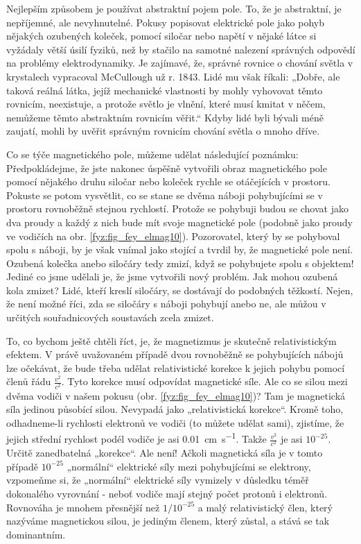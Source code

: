     Nejlepším způsobem je používat abstraktní pojem pole. To, že je abstraktní, je nepříjemné, ale   
    nevyhnutelné. Pokusy popisovat elektrické pole jako pohyb nějakých ozubených koleček, pomocí 
    siločar nebo napětí v nějaké látce si vyžádaly větší úsilí fyziků, než by stačilo na samotné 
    nalezení správných odpovědí na problémy elektrodynamiky. Je zajímavé, že, správné rovnice o 
    chování světla v krystalech vypracoval McCullough už r. 1843. Lidé mu však říkali: „Dobře, ale 
    taková reálná látka, jejíž mechanické vlastnosti by mohly vyhovovat těmto rovnicím, neexistuje, 
    a protože světlo je vlnění, které musí kmitat v něčem, nemůžeme těmto abstraktním rovnicím 
    věřit.“ Kdyby lidé byli bývali méně zaujatí, mohli by uvěřit správným rovnicím chování světla o 
    mnoho dříve.
    
    Co se týče magnetického pole, můžeme udělat následující poznámku: Předpokládejme, že jste 
    nakonec úspěšně vytvořili obraz magnetického pole pomocí nějakého druhu siločar nebo koleček 
    rychle se otáčejících v prostoru. Pokuste se potom vysvětlit, co se stane se dvěma náboji 
    pohybujícími se v prostoru rovnoběžně stejnou rychlostí. Protože se pohybuji budou se chovat 
    jako dva proudy a každý z nich bude mít svoje magnetické pole (podobně jako proudy ve vodičích 
    na obr. \ref{fyz:fig_fey_elmag10}). Pozorovatel, který by se pohyboval spolu s náboji, by je 
    však vnímal jako stojící a tvrdil by, že magnetické pole není. Ozubená kolečka anebo siločáry 
    tedy zmizí, když se pohybujete spolu s objektem! Jediné co jsme udělali je, že jsme vytvořili 
    nový problém. Jak mohou ozubená kola zmizet? Lidé, kteří kreslí siločáry, se dostávají do 
    podobných těžkostí. Nejen, že není možné říci, zda se siločáry s náboji pohybují anebo ne, ale 
    můžou v určitých souřadnicových soustavách zcela zmizet.
    
    To, co bychom ještě chtěli říct, je, že magnetizmus je skutečně relativistickým efektem. V právě
    uvažovaném případě dvou rovnoběžně se pohybujících nábojů lze očekávat, že bude třeba udělat  
    relativistické korekce k jejich pohybu pomocí členů řádu \(\frac{v^2}{c^2}\). Tyto korekce musí 
    odpovídat magnetické síle. Ale co se silou mezi dvěma vodiči v našem pokusu (obr. 
    \ref{fyz:fig_fey_elmag10})? Tam je magnetická síla jedinou působící silou. Nevypadá jako 
    „relativistická korekce“. Kromě toho, odhadneme-li rychlosti elektronů ve vodiči (to můžete 
    udělat sami), zjistíme, že jejich střední rychlost podél vodiče je asi 
    \SI{0,01}{\centi\metre\per\second}. Takže \(\frac{v^2}{c^2}\) je asi \(10^{-25}\). Určitě 
    zanedbatelná „korekce“. Ale není! Ačkoli magnetická síla je v tomto případě \(10^{-25}\) 
    „normální“ elektrické síly mezi pohybujícími se elektrony, vzpomeňme si, že „normální“ 
    elektrické síly vymizely v důsledku téměř dokonalého vyrovnání - neboť vodiče mají stejný počet 
    protonů i elektronů. Rovnováha je mnohem přesnější než \(1/10^{-25}\) a malý relativistický 
    člen, který nazýváme magnetickou silou, je jediným členem, který zůstal, a stává se tak 
    dominantním.
    
